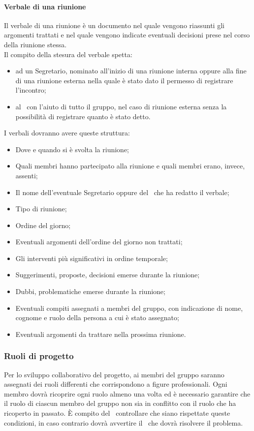 \documentclass[../NormeProgetto.tex]{subfiles}
\begin{document}
			\paragraph{Verbale di una riunione}
			Il verbale di una riunione è un documento nel quale vengono riassunti gli argomenti trattati e nel quale vengono indicate eventuali decisioni prese nel corso della riunione stessa.\\ Il compito della stesura del verbale spetta:
			\begin{itemize}
				\item ad un Segretario, nominato all'inizio di una riunione interna oppure alla fine di una riunione esterna nella quale è stato dato il permesso di registrare l'incontro;
				\item al \responsabilediprogetto\ con l'aiuto di tutto il gruppo, nel caso di riunione esterna senza la possibilità di registrare quanto è stato detto.
			\end{itemize}
			I verbali dovranno avere queste struttura:
			\begin{itemize}
			\item Dove e quando si è svolta la riunione;
			\item Quali membri hanno partecipato alla riunione e quali membri erano, invece, assenti;
			\item Il nome dell'eventuale Segretario oppure del \responsabilediprogetto\ che ha redatto il verbale;
			\item Tipo di riunione;
			\item Ordine del giorno;
			\item Eventuali argomenti dell'ordine del giorno non trattati;
			\item Gli interventi più significativi in ordine temporale;
			\item Suggerimenti, proposte, decisioni emerse durante la riunione;
			\item Dubbi, problematiche emerse durante la riunione;
			\item Eventuali compiti assegnati a membri del gruppo, con indicazione di nome, cognome e ruolo della persona a cui è stato assegnato;
			\item Eventuali argomenti da trattare nella prossima riunione.
			\end{itemize}
		\subsubsection{Ruoli di progetto}
		Per lo sviluppo collaborativo del progetto, ai membri del gruppo saranno assegnati dei ruoli differenti che corrispondono a figure professionali. Ogni membro dovrà ricoprire ogni ruolo almeno una volta ed è necessario garantire che il ruolo di ciascun membro del gruppo non sia in conflitto con il ruolo che ha ricoperto in passato. È compito del \verificatore\ controllare che siano rispettate queste condizioni, in caso contrario dovrà avvertire il \responsabilediprogetto\ che dovrà risolvere il problema.
\end{document}
